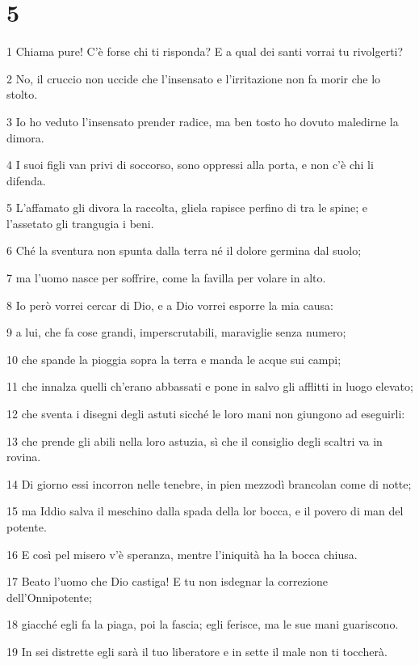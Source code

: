 \chapter{5}

\par 1 Chiama pure! C'è forse chi ti risponda? E a qual dei santi vorrai tu rivolgerti?
\par 2 No, il cruccio non uccide che l'insensato e l'irritazione non fa morir che lo stolto.
\par 3 Io ho veduto l'insensato prender radice, ma ben tosto ho dovuto maledirne la dimora.
\par 4 I suoi figli van privi di soccorso, sono oppressi alla porta, e non c'è chi li difenda.
\par 5 L'affamato gli divora la raccolta, gliela rapisce perfino di tra le spine; e l'assetato gli trangugia i beni.
\par 6 Ché la sventura non spunta dalla terra né il dolore germina dal suolo;
\par 7 ma l'uomo nasce per soffrire, come la favilla per volare in alto.
\par 8 Io però vorrei cercar di Dio, e a Dio vorrei esporre la mia causa:
\par 9 a lui, che fa cose grandi, imperscrutabili, maraviglie senza numero;
\par 10 che spande la pioggia sopra la terra e manda le acque sui campi;
\par 11 che innalza quelli ch'erano abbassati e pone in salvo gli afflitti in luogo elevato;
\par 12 che sventa i disegni degli astuti sicché le loro mani non giungono ad eseguirli:
\par 13 che prende gli abili nella loro astuzia, sì che il consiglio degli scaltri va in rovina.
\par 14 Di giorno essi incorron nelle tenebre, in pien mezzodì brancolan come di notte;
\par 15 ma Iddio salva il meschino dalla spada della lor bocca, e il povero di man del potente.
\par 16 E così pel misero v'è speranza, mentre l'iniquità ha la bocca chiusa.
\par 17 Beato l'uomo che Dio castiga! E tu non isdegnar la correzione dell'Onnipotente;
\par 18 giacché egli fa la piaga, poi la fascia; egli ferisce, ma le sue mani guariscono.
\par 19 In sei distrette egli sarà il tuo liberatore e in sette il male non ti toccherà.
